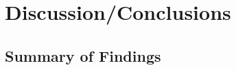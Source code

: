 
\chapter{Discussion/Conclusions} %

\label{Chapter4} %


\section{Summary of Findings}
\begin{comment}
Here you will bring together the work of the dissertation by showing how the initial research plan has been addressed in such a way that conclusions may be formed from the evidence of the dissertation. 
No new material or references should be placed here. 
The conclusions should make a statement on the extent to which each of the aims and objectives has been met. 
You should bring back your research questions and state clearly your understanding of those questions.
Be careful not to make claims that are not substantiated from the evidence you have presented in earlier chapters.
If you are undertaking a company project based around a business issue do not confuse recommendations for the company with conclusions. 

Provide inferences and implications that the results of the study provide you and
the reader or others who may have interest in the results. This is a time to
expound on your results and offer insight into what your study does or does not
contribute to the body of information on your topic.

Conclusions Drawn by Results
Identify specific conclusions resulting from you study. Offer specific insight to
what your findings reveal. This section should synthesize your findings with the
current knowledge in your area of study.



\section{Recommendations for Further Research}
Provide recommendations to further research on this topic or how parts of your
study could be improved upon. If you found as a result of your study that
another topic should be looked at in order to offer more insight into this topic,
then suggest that at this time. It is important that this part of your conclusion
chapter incorporate the implications of your findings in terms of other research in
your area of study.


\end{comment}
